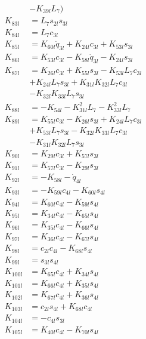\begin{multicols}{2}
\begin{align}
&- K_{39l}L_7) \nonumber \\
K_{83l} &= L_7s_{2l}s_{3l} \nonumber \\
K_{84l} &= L_7c_{3l} \nonumber \\
K_{85l} &= K_{60l}\dot{q}_{3l} + K_{24l}c_{3l} + K_{53l}s_{3l} \nonumber \\
K_{86l} &= K_{53l}c_{3l} - K_{58l}\dot{q}_{3l} - K_{24l}s_{3l} \nonumber \\
K_{87l} &= K_{26l}c_{3l} + K_{55l}s_{3l} - K_{53l}L_7c_{3l}  \nonumber \\
&+ K_{24l}L_7s_{3l} + K_{31l}K_{32l}L_7c_{3l}  \nonumber \\
&- K_{32l}K_{33l}L_7s_{3l} \nonumber \\
K_{88l} &= - K_{54l} - K_{31l}^2L_7 - K_{33l}^2L_7 \nonumber \\
K_{89l} &= K_{55l}c_{3l} - K_{26l}s_{3l} + K_{24l}L_7c_{3l}  \nonumber \\
&+ K_{53l}L_7s_{3l} - K_{32l}K_{33l}L_7c_{3l}  \nonumber \\
&- K_{31l}K_{32l}L_7s_{3l} \nonumber \\
K_{90l} &= K_{29l}c_{3l} + K_{57l}s_{3l} \nonumber \\
K_{91l} &= K_{57l}c_{3l} - K_{29l}s_{3l} \nonumber \\
K_{92l} &= - K_{58l} - \dot{q}_{4l} \nonumber \\
K_{93l} &= - K_{59l}c_{4l} - K_{60l}s_{4l} \nonumber \\
K_{94l} &= K_{60l}c_{4l} - K_{59l}s_{4l} \nonumber \\
K_{95l} &= K_{34l}c_{4l} - K_{65l}s_{4l} \nonumber \\
K_{96l} &= K_{35l}c_{4l} - K_{66l}s_{4l} \nonumber \\
K_{97l} &= K_{36l}c_{4l} - K_{67l}s_{4l} \nonumber \\
K_{98l} &= c_{2l}c_{4l} - K_{68l}s_{4l} \nonumber \\
K_{99l} &= s_{3l}s_{4l} \nonumber \\
K_{100l} &= K_{65l}c_{4l} + K_{34l}s_{4l} \nonumber \\
K_{101l} &= K_{66l}c_{4l} + K_{35l}s_{4l} \nonumber \\
K_{102l} &= K_{67l}c_{4l} + K_{36l}s_{4l} \nonumber \\
K_{103l} &= c_{2l}s_{4l} + K_{68l}c_{4l} \nonumber \\
K_{104l} &= -c_{4l}s_{3l} \nonumber \\
K_{105l} &= K_{40l}c_{4l} - K_{70l}s_{4l} \nonumber \\

\end{align}
\end{multicols}
